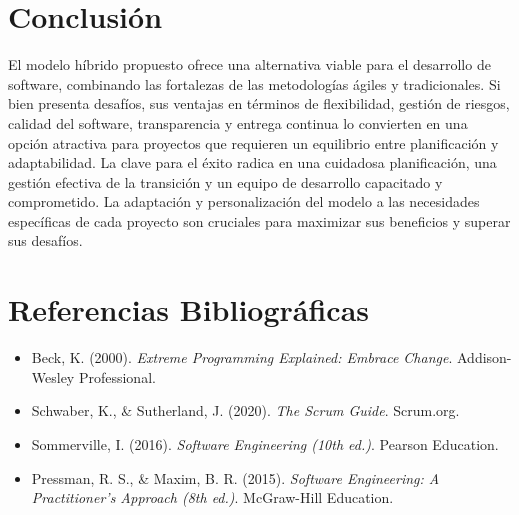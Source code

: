 \documentclass{article}
\begin{document}
\section{Conclusión}

El modelo híbrido propuesto ofrece una alternativa viable para el desarrollo de software, combinando las fortalezas de las metodologías ágiles y tradicionales.  Si bien presenta desafíos, sus ventajas en términos de flexibilidad, gestión de riesgos, calidad del software, transparencia y entrega continua lo convierten en una opción atractiva para proyectos que requieren un equilibrio entre planificación y adaptabilidad. La clave para el éxito radica en una cuidadosa planificación, una gestión efectiva de la transición y un equipo de desarrollo capacitado y comprometido. La adaptación y personalización del modelo a las necesidades específicas de cada proyecto son cruciales para maximizar sus beneficios y superar sus desafíos.

\section{Referencias Bibliográficas}

\begin{itemize}
    \item Beck, K. (2000). \textit{Extreme Programming Explained: Embrace Change}. Addison-Wesley Professional.
    \item Schwaber, K., \& Sutherland, J. (2020). \textit{The Scrum Guide}. Scrum.org.
    \item Sommerville, I. (2016). \textit{Software Engineering (10th ed.)}. Pearson Education.
    \item Pressman, R. S., \& Maxim, B. R. (2015). \textit{Software Engineering: A Practitioner's Approach (8th ed.)}. McGraw-Hill Education.
\end{itemize}
\end{document}

